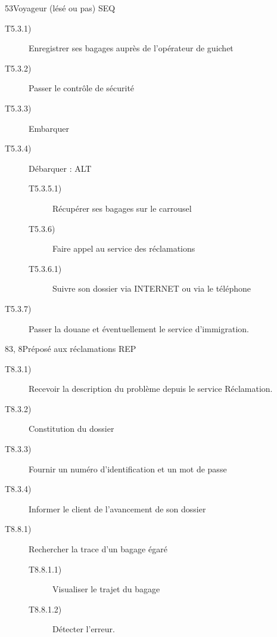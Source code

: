 \dta
{5}{3}{Voyageur (lésé ou pas)}
{SEQ}
{
\begin{description}
	\item [T5.3.1)] Enregistrer ses bagages auprès de l'opérateur de guichet
	\item [T5.3.2)] Passer le contrôle de sécurité
	\item [T5.3.3)] Embarquer
	\item [T5.3.4)] Débarquer : ALT
	\begin{description}
		\item [T5.3.5.1)] Récupérer ses bagages sur le carrousel
		\item [T5.3.6)] Faire appel au service des réclamations
		\item [T5.3.6.1)] Suivre son dossier via INTERNET ou via le téléphone
	\end{description}
	\item [T5.3.7)] Passer la douane et éventuellement le service d'immigration.
\end{description}
}

\dta
{8}{3, 8}{Préposé aux réclamations}
{REP}
{
\begin{description}
	\item [T8.3.1)] Recevoir la description du problème depuis le service \og Réclamation\fg.
	\item [T8.3.2)] Constitution du dossier 
	\item [T8.3.3)] Fournir un numéro d'identification et un mot de passe
	\item [T8.3.4)] Informer le client de l'avancement de son dossier

	\item [T8.8.1)] Rechercher la trace d'un bagage égaré
	\begin{description}
		\item [T8.8.1.1)] Visualiser le trajet du bagage
		\item [T8.8.1.2)] Détecter l'erreur.
	\end{description}
\end{description}
}
